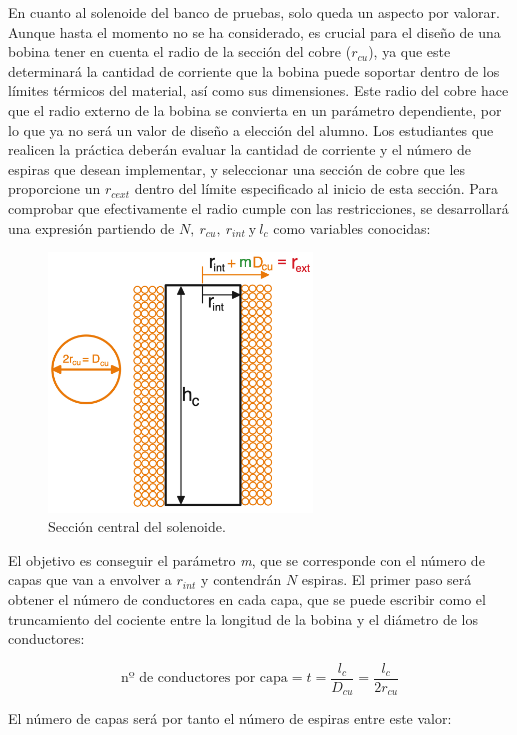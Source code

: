 En cuanto al solenoide del banco de pruebas, solo queda un aspecto por valorar. Aunque hasta el momento no se ha considerado, es crucial para el diseño de una bobina tener en cuenta el radio de la sección del cobre (\(r_{cu}\)), ya que este determinará la cantidad de corriente que la bobina puede soportar dentro de los límites térmicos del material, así como sus dimensiones. Este radio del cobre hace que el radio externo de la bobina se convierta en un parámetro dependiente, por lo que ya no será un valor de diseño a elección del alumno. Los estudiantes que realicen la práctica deberán evaluar la cantidad de corriente y el número de espiras que desean implementar, y seleccionar una sección de cobre que les proporcione un \(r_{cext}\) dentro del límite especificado al inicio de esta sección. Para comprobar que efectivamente el radio cumple con las restricciones, se desarrollará una expresión partiendo de \(N,~r_{cu},~r_{int}~\text{y}~l_c\) como variables conocidas:

\begin{figure}[H]
    \centering
    \includegraphics[width=7cm]{FigurasMemoria/esquemaBobinaREXT.png}
    \caption{Sección central del solenoide.}
    \label{fig:esquemaBobinaREXT} %
\end{figure}

El objetivo es conseguir el parámetro \textit{m}, que se corresponde con el número de capas que van a envolver a \(r_{int}\) y contendrán \(N\) espiras. El primer paso será obtener el número de conductores en cada capa, que se puede escribir como el truncamiento del cociente entre la longitud de la bobina y el diámetro de los conductores:

\[\text{nº~de~conductores~por~capa}=t=\frac{l_c}{D_{cu}}=\frac{l_c}{2r_{cu}}\]

El número de capas será por tanto el número de espiras entre este valor:

